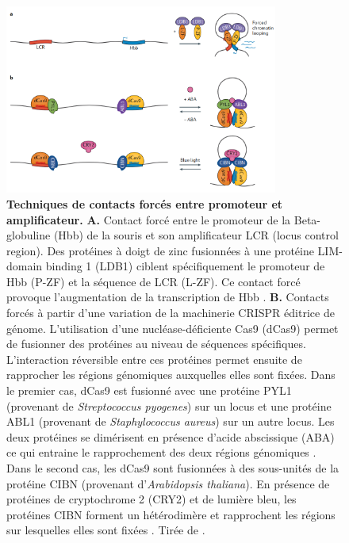 \begin{figure}[H]
    \centering
    \includegraphics[width=0.8\textwidth, page=1] {figures/introduction/fig12.png}
    \caption[Techniques de contacts forcés entre promoteur et \gls{amplificateur}.]{
    \textbf{Techniques de contacts forcés entre promoteur et \gls{amplificateur}.}
    \textbf{A.} Contact forcé entre le promoteur de la Beta-globuline (Hbb) de la souris et son amplificateur LCR (locus control region). Des protéines à doigt de zinc fusionnées à une protéine LIM-domain binding 1 (LDB1) ciblent spécifiquement le promoteur de Hbb (P-ZF) et la séquence de LCR (L-ZF). Ce contact forcé provoque l'augmentation de la transcription de Hbb \citep{deng_controlling_2012}.
    \textbf{\textbf{B.}} Contacts forcés à partir d'une variation de la machinerie CRISPR éditrice de génome. L'utilisation d'une nucléase-déficiente Cas9 (dCas9) permet de fusionner des protéines au niveau de séquences spécifiques. L'interaction réversible entre ces protéines permet ensuite de rapprocher les régions génomiques auxquelles elles sont fixées. Dans le premier cas, dCas9 est fusionné avec une protéine PYL1 (provenant de \textit{Streptococcus pyogenes}) sur un locus et une protéine ABL1 (provenant de \textit{Staphylococcus aureus}) sur un autre locus. Les deux protéines se dimérisent en présence d'acide abscissique (ABA) ce qui entraine le rapprochement des deux régions génomiques \citep{morgan_manipulation_2017}. Dans le second cas, les dCas9 sont fusionnées à des sous-unités de la protéine CIBN (provenant d'\textit{Arabidopsis thaliana}). En présence de protéines de cryptochrome 2 (CRY2) et de lumière bleu, les protéines CIBN forment un hétérodimère et rapprochent les régions sur lesquelles elles sont fixées \citep{kim_ladl_2019}. Tirée de \citep{schoenfelder_long-range_2019}.\\
    }
    \label{fig:Fig12}
\end{figure}

